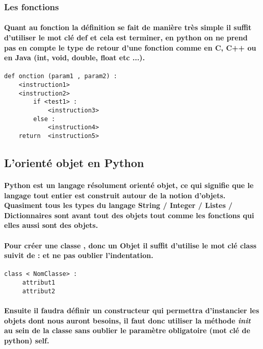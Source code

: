 \documentclass[a4paper, 12pt, twoside]{article}
\begin{document}
\subsubsection{ Les fonctions}
\paragraph{Quant au fonction la définition se fait de manière très simple il suffit d'utiliser le mot clé def et cela est terminer, en python on ne prend pas en compte le type de retour d'une fonction comme en C, C++ ou en Java (int, void, double, float etc ...).}
\begin{verbatim}
def onction (param1 , param2) :
    <instruction1>
    <instruction2>
        if <test1> :
            <instruction3>
        else :
            <instruction4>
    return  <instruction5>
\end{verbatim}

\subsection{L'orienté objet en Python}
\paragraph{ Python est un langage résolument orienté objet, ce qui signifie que le langage tout entier est construit autour de la notion d’objets. Quasiment tous les types du langage String / Integer / Listes / Dictionnaires  sont avant tout des objets tout comme les fonctions
qui elles aussi sont des objets.}

\paragraph{ Pour créer une classe , donc un Objet il suffit d'utilise le mot clé class suivit de  :  et ne pas oublier l'indentation.}
\begin{verbatim}
class < NomClasse> : 
     attribut1
     attribut2 
\end{verbatim}

\paragraph{Ensuite il faudra définir un constructeur qui permettra d'instancier les objets dont nous auront besoins, il faut donc utiliser la méthode  \textit{init} au sein de la classe sans oublier le paramètre obligatoire (mot clé de python) self. }
\end{document}
